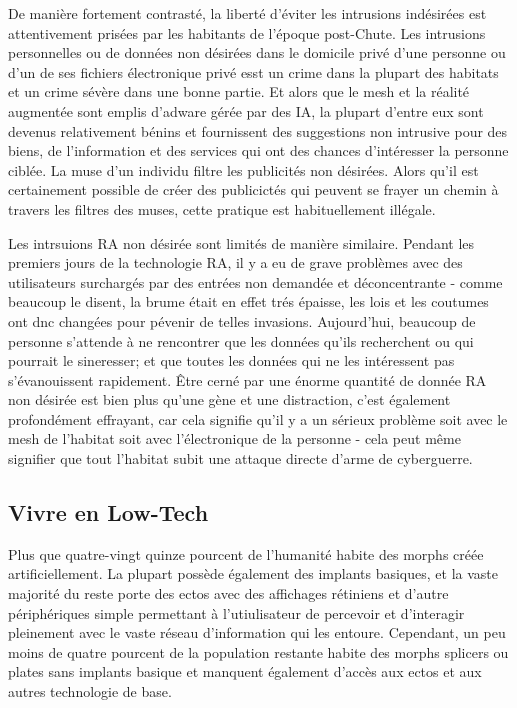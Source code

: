 De manière fortement contrasté, la liberté d'éviter les intrusions indésirées est attentivement prisées par les habitants de l'époque post-Chute. Les intrusions personnelles ou de données non désirées dans le domicile privé d'une personne ou d'un de ses fichiers électronique privé esst un crime dans la plupart des habitats et un crime sévère dans une bonne partie. Et alors que le mesh et la réalité augmentée sont emplis d'adware gérée par des IA, la plupart d'entre eux sont devenus relativement bénins et fournissent des suggestions non intrusive pour des biens, de l'information et des services qui ont des chances d'intéresser la personne ciblée. La muse d'un individu filtre les publicités non désirées. Alors qu'il est certainement possible de créer des publicictés qui peuvent se frayer un chemin à travers les filtres des muses, cette pratique est habituellement illégale. 

Les intrsuions RA non désirée sont limités de manière similaire. Pendant les premiers jours de la technologie RA, il y a eu de grave problèmes avec des utilisateurs surchargés par des entrées non demandée et déconcentrante - comme beaucoup le disent, la brume était en effet trés épaisse, les lois et les coutumes ont dnc changées pour pévenir de telles invasions. Aujourd'hui, beaucoup de personne s'attende à ne rencontrer que les données qu'ils recherchent ou qui pourrait le sineresser; et que toutes les données qui ne les intéressent pas s'évanouissent rapidement. Être cerné par une énorme quantité de donnée RA non désirée est bien plus qu'une gène et une distraction, c'est également profondément effrayant, car cela signifie qu'il y a un sérieux problème soit avec le mesh de l'habitat soit avec l'électronique de la personne - cela peut même signifier que tout l'habitat subit une attaque directe d'arme de cyberguerre. 

\subsection{Vivre en Low-Tech} \label{sec:low-tech-existence} 

Plus que quatre-vingt quinze pourcent de l'humanité habite des morphs créée artificiellement. La plupart possède également des implants basiques, et la vaste majorité du reste porte des ectos avec des affichages rétiniens et d'autre périphériques simple permettant à l'utiulisateur de percevoir et d'interagir pleinement avec le vaste réseau d'information qui les entoure. Cependant, un peu moins de quatre pourcent de la population restante habite des morphs splicers ou plates sans implants basique et manquent également d'accès aux ectos et aux autres technologie de base. 

